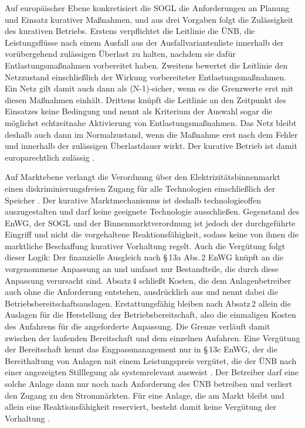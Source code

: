 Auf europäischer Ebene konkretisiert die \ac{SOGL} die Anforderungen an Planung und Einsatz kurativer Maßnahmen, und aus drei Vorgaben folgt die Zulässigkeit des kurativen Betriebs.
Erstens verpflichtet die Leitlinie die \ac{ÜNB}, die Leistungsflüsse nach einem Ausfall aus der Ausfallvariantenliste innerhalb der vorübergehend zulässigen Überlast zu halten, nachdem sie dafür Entlastungsmaßnahmen vorbereitet haben.
Zweitens bewertet die Leitlinie den Netzzustand einschließlich der Wirkung vorbereiteter Entlastungsmaßnahmen.
Ein Netz gilt damit auch dann als \mbox{(N-1)-sicher}, wenn es die Grenzwerte erst mit diesen Maßnahmen einhält.
Drittens knüpft die Leitlinie an den Zeitpunkt des Einsatzes keine Bedingung und nennt als Kriterium der Auswahl sogar die \glqq{}möglichst echtzeitnahe Aktivierung von Entlastungsmaßnahmen\grqq{}.
Das Netz bleibt deshalb auch dann im Normalzustand, wenn die Maßnahme erst nach dem Fehler und innerhalb der zulässigen Überlastdauer wirkt.
Der kurative Betrieb ist damit europarechtlich zulässig \cite{europaische_kommission_verordnung_2017}.

Auf Marktebene verlangt die \glqq{}Verordnung über den Elektrizitätsbinnenmarkt\grqq{} einen diskriminierungsfreien Zugang für alle Technologien einschließlich der Speicher \cite{europaisches_parlament_und_rat_der_eu_verordnung_2019}.
Der kurative Marktmechanismus ist deshalb technologieoffen auszugestalten und darf keine geeignete Technologie ausschließen.
Gegenstand des \ac{EnWG}, der \ac{SOGL} und der Binnenmarktverordnung ist jedoch der durchgeführte Eingriff und nicht die vorgehaltene Reaktionsfähigkeit, sodass keine von ihnen die marktliche Beschaffung kurativer Vorhaltung regelt.
Auch die Vergütung folgt dieser Logik: Der finanzielle Ausgleich nach §\,13a Abs.\,2 \ac{EnWG} knüpft an die vorgenommene Anpassung an und umfasst nur Bestandteile, die durch diese Anpassung verursacht sind.
Absatz\,4 schließt Kosten, die dem Anlagenbetreiber auch ohne die Anforderung entstehen, ausdrücklich aus und nennt dabei die Betriebsbereitschaftsauslagen.
Erstattungsfähig bleiben nach Absatz\,2 allein die Auslagen für die Herstellung der Betriebsbereitschaft, also die einmaligen Kosten des Anfahrens für die angeforderte Anpassung.
Die Grenze verläuft damit zwischen der laufenden Bereitschaft und dem einzelnen Anfahren.
Eine Vergütung der Bereitschaft kennt das Engpassmanagement nur in §\,13c \ac{EnWG}, der die Bereithaltung von Anlagen mit einem Leistungspreis vergütet, die der \ac{ÜNB} nach einer angezeigten Stilllegung als systemrelevant ausweist \cite{bundesministerium_der_justiz_energiewirtschaftsgesetz_2025}.
Der Betreiber darf eine solche Anlage dann nur noch nach Anforderung des \ac{ÜNB} betreiben und verliert den Zugang zu den Strommärkten.
Für eine Anlage, die am Markt bleibt und allein eine Reaktionsfähigkeit reserviert, besteht damit keine Vergütung der Vorhaltung \cite{bundesministerium_der_justiz_energiewirtschaftsgesetz_2025}.

